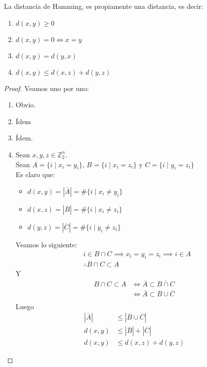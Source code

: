 \begin{proposition}
La distancia de Hamming, es propiamente una distancia, es decir:
\begin{enumerate}
\item $d(x,y) \ge 0$
\item $d(x,y) = 0 \iff x = y$
\item $d(x,y) = d(y,x)$
\item $d(x,y) \le d(x,z) +d(y,z)$
\end{enumerate}
\end{proposition}

\begin{proof} Veamos uno por uno:
\begin{enumerate}
\item Obvio.
\item Ídem
\item Ídem.
\item Sean $x,y,z \in \mathbb{Z}_2^n$.\\
Sean $A = \{i \mid x_i = y_i\}$, 
$B = \{i \mid x_i = z_i\}$ y $C = \{i \mid y_i = z_i\}$\\
Es claro que:
\begin{itemize}
    \item $d(x,y) = \left| \overline{A} \right| = \# \{i \mid x_i \neq y_i \}$
    \item $d(x,z) = \left| \overline{B} \right| = \# \{i \mid x_i \neq z_i \}$
    \item $d(y,z) = \left| \overline{C} \right| = \# \{i \mid y_i \neq z_i \}$
\end{itemize}
Veamos lo siguiente:
\begin{align}
& i \in B \cap C \implies x_i = y_i = z_i \implies i \in A\\
& \therefore B \cap C \subset A
\end{align}
Y
\begin{align}
B \cap C \subset A
&\iff \overline{A} \subset \overline{B \cap C}\\
&\iff \overline{A} \subset \overline{B} \cup \overline{C}\\
\end{align}
Luego
\begin{align}
\left| \overline{A} \right| & \le \left| \overline{B}\cup\overline{C} \right|\\
d(x,y) &\le \left| \overline{B} \right| + \left| \overline{C} \right|\\
d(x,y) &\le d(x,z) + d(y,z)
\end{align}
\end{enumerate}
\end{proof}

